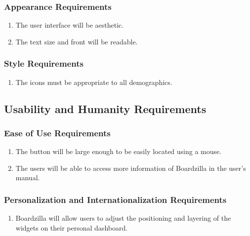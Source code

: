 \documentclass[]{article}
\begin{document}
\subsubsection{Appearance Requirements}
\label{ssub:appearance_requirements}
\begin{enumerate}[{LF}1. ]
	\item The user interface will be aesthetic.
	\item The text size and front will be readable.
\end{enumerate}

\subsubsection{Style Requirements}
\label{ssub:style_requirements}
\begin{enumerate}[{LF}1. ]
	\item The icons must be appropriate to all demographics. 
\end{enumerate}


\subsection{Usability and Humanity Requirements}
\label{sub:usability_and_humanity_requirements}

\subsubsection{Ease of Use Requirements}
\label{ssub:ease_of_use_requirements}
\begin{enumerate}[{UH}1. ]
    \item The button will be large enough to be easily located using a mouse.
	\item The users will be able to access more information of Boardzilla in the user's manual. 
\end{enumerate}

\subsubsection{Personalization and Internationalization Requirements}
\label{ssub:personalization_and_internationalization_requirements}
\begin{enumerate}[{UH}1. ]
	\item Boardzilla will allow users to adjust the positioning and layering of the widgets on their personal dashboard.
\end{enumerate}
\end{document}
